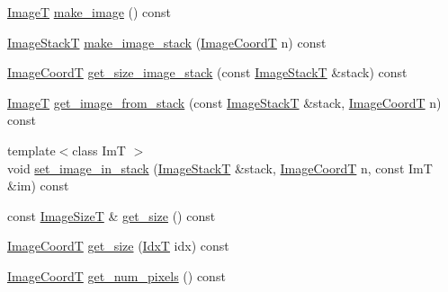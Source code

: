\begin{DoxyCompactItemize}
\item 
\hyperlink{classmappel_1_1ImageFormat2DBase_a667ea5016648958e507e7db8eaa041b0}{ImageT} \hyperlink{classmappel_1_1ImageFormat2DBase_ab5d6c4f7f3818f4652fcf8d54351c981}{make\+\_\+image} () const 
\item 
\hyperlink{classmappel_1_1ImageFormat2DBase_a8f0276e94ff242fa4740a718642f5e14}{Image\+StackT} \hyperlink{classmappel_1_1ImageFormat2DBase_a76f8b347ce6c104973dec235398a4f32}{make\+\_\+image\+\_\+stack} (\hyperlink{classmappel_1_1ImageFormat2DBase_a45e9234d63c357f34ca56c72c12b9e9c}{Image\+CoordT} n) const 
\item 
\hyperlink{classmappel_1_1ImageFormat2DBase_a45e9234d63c357f34ca56c72c12b9e9c}{Image\+CoordT} \hyperlink{classmappel_1_1ImageFormat2DBase_a8ac2ce73a9b353b92a688224ccc4d217}{get\+\_\+size\+\_\+image\+\_\+stack} (const \hyperlink{classmappel_1_1ImageFormat2DBase_a8f0276e94ff242fa4740a718642f5e14}{Image\+StackT} \&stack) const 
\item 
\hyperlink{classmappel_1_1ImageFormat2DBase_a667ea5016648958e507e7db8eaa041b0}{ImageT} \hyperlink{classmappel_1_1ImageFormat2DBase_a22701571228f52dd6cfeac72ab18908c}{get\+\_\+image\+\_\+from\+\_\+stack} (const \hyperlink{classmappel_1_1ImageFormat2DBase_a8f0276e94ff242fa4740a718642f5e14}{Image\+StackT} \&stack, \hyperlink{classmappel_1_1ImageFormat2DBase_a45e9234d63c357f34ca56c72c12b9e9c}{Image\+CoordT} n) const 
\item 
{\footnotesize template$<$class ImT $>$ }\\void \hyperlink{classmappel_1_1ImageFormat2DBase_aaae78a9b02452eb3538af34fcdcc3ad2}{set\+\_\+image\+\_\+in\+\_\+stack} (\hyperlink{classmappel_1_1ImageFormat2DBase_a8f0276e94ff242fa4740a718642f5e14}{Image\+StackT} \&stack, \hyperlink{classmappel_1_1ImageFormat2DBase_a45e9234d63c357f34ca56c72c12b9e9c}{Image\+CoordT} n, const ImT \&im) const 
\item 
const \hyperlink{classmappel_1_1ImageFormat2DBase_a49cccf61eb2a768a202634d27fcd81d5}{Image\+SizeT} \& \hyperlink{classmappel_1_1ImageFormat2DBase_a4497fe096f82ccb3af3c3632921081a5}{get\+\_\+size} () const 
\item 
\hyperlink{classmappel_1_1ImageFormat2DBase_a45e9234d63c357f34ca56c72c12b9e9c}{Image\+CoordT} \hyperlink{classmappel_1_1ImageFormat2DBase_a07ad97af7e697240ee359ae6a4821a2f}{get\+\_\+size} (\hyperlink{namespacemappel_ab17ec0f30b61ece292439d7ece81d3a8}{IdxT} idx) const 
\item 
\hyperlink{classmappel_1_1ImageFormat2DBase_a45e9234d63c357f34ca56c72c12b9e9c}{Image\+CoordT} \hyperlink{classmappel_1_1ImageFormat2DBase_a4f9e0d332462ff53678c03700666a564}{get\+\_\+num\+\_\+pixels} () const 

\end{DoxyCompactItemize}
